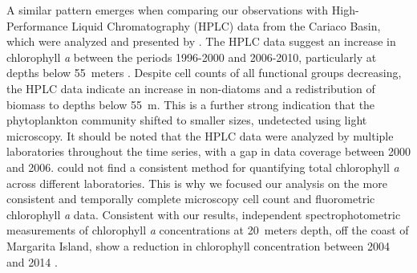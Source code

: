 \documentclass[draft]{agujournal2019}
\begin{document}
A similar pattern emerges when comparing our observations with High-Performance Liquid Chromatography (HPLC) data from the Cariaco Basin, which were analyzed and presented by . The HPLC data suggest an increase in chlorophyll \textit{a} between the periods 1996-2000 and 2006-2010, particularly at depths below \qty{55}{meters} \cite{pinckney_phytoplankton_2015}. Despite cell counts of all functional groups decreasing, the HPLC data indicate an increase in non-diatoms and a redistribution of biomass to depths below \qty{55}{\meter}. This is a further strong indication that the phytoplankton community shifted to smaller sizes, undetected using light microscopy.
It should be noted that the HPLC data were analyzed by multiple laboratories throughout the time series, with a gap in data coverage between 2000 and 2006.  could not find a consistent method for quantifying total chlorophyll \textit{a} across different laboratories. This is why we focused our analysis on the more consistent and temporally complete microscopy cell count and fluorometric chlorophyll \textit{a} data.
Consistent with our results, independent spectrophotometric measurements of chlorophyll \textit{a} concentrations at \qty{20}{meters} depth, off the coast of Margarita Island, show a reduction in chlorophyll concentration between 2004 and 2014 \cite{gomez_gaspar_variacion_2025}.
\end{document}
